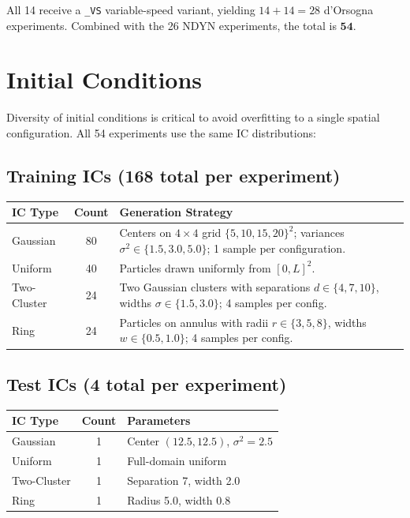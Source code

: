 \documentclass[11pt]{article}
\begin{document}
All 14 receive a \texttt{\_VS} variable-speed variant, yielding $14 + 14
= 28$ d'Orsogna experiments.  Combined with the 26 NDYN experiments, the
total is $\mathbf{54}$.


\section{Initial Conditions}
\label{sec:ics}

Diversity of initial conditions is critical to avoid overfitting to
a single spatial configuration.  All 54 experiments use the same IC
distributions:

\subsection{Training ICs (168 total per experiment)}

\begin{longtable}{lcp{8cm}}
    \toprule
    \textbf{IC Type} & \textbf{Count} & \textbf{Generation Strategy} \\
    \midrule
    Gaussian      & 80 & Centers on $4\times4$ grid $\{5,10,15,20\}^2$;
                         variances $\sigma^2\in\{1.5, 3.0, 5.0\}$;
                         1 sample per configuration.\\[3pt]
    Uniform       & 40 & Particles drawn uniformly from $[0,L]^2$. \\[3pt]
    Two-Cluster   & 24 & Two Gaussian clusters with separations
                         $d\in\{4,7,10\}$, widths $\sigma\in\{1.5,3.0\}$;
                         4 samples per config. \\[3pt]
    Ring          & 24 & Particles on annulus with radii
                         $r\in\{3,5,8\}$, widths $w\in\{0.5,1.0\}$;
                         4 samples per config. \\
    \bottomrule
\end{longtable}

\subsection{Test ICs (4 total per experiment)}

\begin{longtable}{lcp{9cm}}
    \toprule
    \textbf{IC Type} & \textbf{Count} & \textbf{Parameters} \\
    \midrule
    Gaussian      & 1 & Center $(12.5, 12.5)$, $\sigma^2=2.5$ \\
    Uniform       & 1 & Full-domain uniform \\
    Two-Cluster   & 1 & Separation 7, width 2.0 \\
    Ring          & 1 & Radius 5.0, width 0.8 \\
    \bottomrule
\end{longtable}
\end{document}

